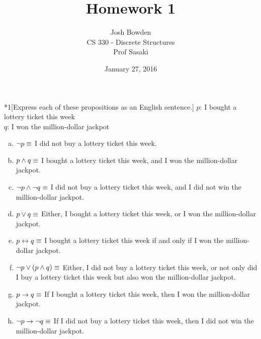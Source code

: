 \documentclass[11pt]{article}
\let\bicond\leftrightarrow
\let\cond\rightarrow
\begin{document}
\title{Homework 1}
\author{Josh Bowden\vspace*{8pt}\\
CS 330 - Discrete Structures\\
Prof Sasaki}

\date{January 27, 2016}

\maketitle

\begin{problem}*{1}[Express each of these propositions as an English sentence.]
$p$: I bought a lottery ticket this week \\
$q$: I won the million-dollar jackpot

\begin{enumerate}[(a)]
\item $\neg p \\ \equiv$ I did not buy a lottery ticket this week.

\item $p \land q \\ \equiv$ I bought a lottery ticket this week, and I won the million-dollar jackpot.

\item $\neg p \land \neg q \\ \equiv$ I did not buy a lottery ticket this week, and I did not win the million-dollar jackpot.

\item $p \lor q \\ \equiv$ Either, I bought a lottery ticket this week, or I won the million-dollar jackpot.

\item $p \bicond q \\ \equiv$ I bought a lottery ticket this week if and only if I won the million-dollar jackpot.

\item $\neg p \lor (p \land q) \\ \equiv$ Either, I did not buy a lottery ticket this week, or not only did I buy a lottery ticket this week but also won the million-dollar jackpot.

\item $p \cond q \\ \equiv$ If I bought a lottery ticket this week, then I won the million-dollar jackpot.

\item $\neg p \cond \neg q \\ \equiv$ If I did not buy a lottery ticket this week, then I did not win the million-dollar jackpot.

\end{enumerate}
\end{problem}
\end{document}
